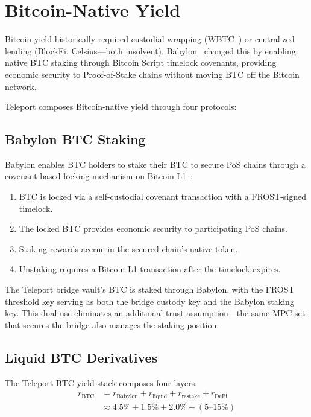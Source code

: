 \section{Bitcoin-Native Yield}
\label{sec:btc}

Bitcoin yield historically required custodial wrapping (WBTC~\cite{wbtc}) or centralized lending (BlockFi, Celsius---both insolvent). Babylon~\cite{babylon2024} changed this by enabling native BTC staking through Bitcoin Script timelock covenants, providing economic security to Proof-of-Stake chains without moving BTC off the Bitcoin network.

Teleport composes Bitcoin-native yield through four protocols:

\subsection{Babylon BTC Staking}

Babylon enables BTC holders to stake their BTC to secure PoS chains through a covenant-based locking mechanism on Bitcoin L1~\cite{babylon2024}:

\begin{enumerate}[nosep]
  \item BTC is locked via a self-custodial covenant transaction with a FROST-signed timelock.
  \item The locked BTC provides economic security to participating PoS chains.
  \item Staking rewards accrue in the secured chain's native token.
  \item Unstaking requires a Bitcoin L1 transaction after the timelock expires.
\end{enumerate}

The Teleport bridge vault's BTC is staked through Babylon, with the FROST threshold key serving as both the bridge custody key and the Babylon staking key. This dual use eliminates an additional trust assumption---the same MPC set that secures the bridge also manages the staking position.

\subsection{Liquid BTC Derivatives}

\begin{definition}
The Teleport BTC yield stack composes four layers:
\begin{align}
  r_{\text{BTC}} &= r_{\text{Babylon}} + r_{\text{liquid}} + r_{\text{restake}} + r_{\text{DeFi}} \label{eq:btc_yield}\\[4pt]
  &\approx 4.5\% + 1.5\% + 2.0\% + (5\text{--}15\%) \nonumber
\end{align}
\end{definition}

